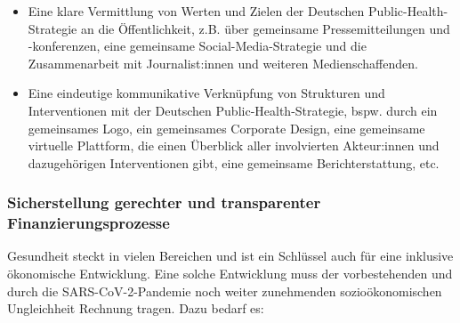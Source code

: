 \documentclass{article}
\begin{document}
\begin{itemize}
\item Eine klare Vermittlung von Werten und Zielen der Deutschen Public-Health-Strategie an die Öffentlichkeit, z.B. über gemeinsame Pressemitteilungen und -konferenzen, eine gemeinsame Social-Media-Strategie und die Zusammenarbeit mit Journalist:innen und weiteren Medienschaffenden. 


\item Eine eindeutige kommunikative Verknüpfung von Strukturen und Interventionen mit der Deutschen Public-Health-Strategie, bspw. durch ein gemeinsames Logo, ein gemeinsames Corporate Design, eine gemeinsame virtuelle Plattform, die einen Überblick aller involvierten Akteur:innen und dazugehörigen Interventionen gibt, eine gemeinsame Berichterstattung, etc. 


\end{itemize}

\subsubsection{Sicherstellung gerechter und transparenter Finanzierungsprozesse}\label{H2910379}



Gesundheit steckt in vielen Bereichen und ist ein Schlüssel auch für eine inklusive ökonomische Entwicklung. Eine solche Entwicklung muss der vorbestehenden und durch die SARS-CoV-2-Pandemie noch weiter zunehmenden sozioökonomischen Ungleichheit Rechnung tragen. Dazu bedarf es:
\end{document}
